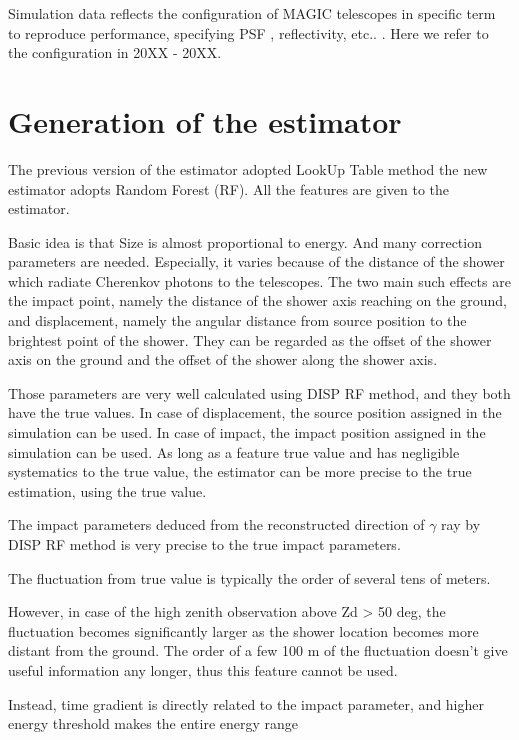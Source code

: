 \documentclass[preprint,12pt,authoryear]{elsarticle}
\begin{document}
Simulation data reflects the configuration of MAGIC telescopes in specific term to reproduce performance, specifying PSF , reflectivity, etc.. . Here we refer to the configuration in 20XX - 20XX.

\section{Generation of the estimator}
The previous version of the estimator adopted LookUp Table method\label{MAGIC_perform}
the new estimator adopts Random Forest (RF). 
All the features are given to the estimator.

Basic idea is that 
Size is almost proportional to energy. And many correction parameters are needed. Especially, it varies because of the distance of the shower which radiate Cherenkov photons to the telescopes. The two main such effects are the impact point, namely the distance of the shower axis reaching on the ground, and displacement, namely the angular distance from source position to the brightest point of the shower. They can be regarded as the offset of the shower axis on the ground and the offset of the shower along the shower axis.

Those parameters are very well calculated using DISP RF method, and they both have the true values. In case of displacement, the source position assigned in the simulation can be used. In case of impact, the impact position assigned in the simulation can be used.
As long as a feature true value and has negligible systematics to the true value, the estimator can be more precise to the true estimation, using the true value. 


The impact parameters deduced from the reconstructed direction of $\gamma$ ray by DISP RF method is very precise to the true impact parameters.

The fluctuation from true value is typically the order of several tens of meters. 


However, in case of the high zenith observation above Zd > 50 deg, the fluctuation becomes significantly larger as the shower location becomes more distant from the ground. The order of a few 100 m of the fluctuation doesn't give useful information any longer, thus this feature cannot be used. 

Instead, time gradient is directly related to the impact parameter, and higher energy threshold makes the entire energy range 
\end{document}
